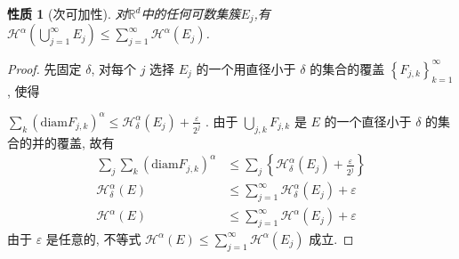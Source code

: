 \documentclass[hyperref,a4paper,UTF8]{ctexart}
\newtheorem{property}{{性质}}
\begin{document}
  \begin{property}[次可加性]
    对$\mathbb{R}^d$中的任何可数集簇${E_j}$,有$\mathcal{H}^{\alpha}\left(\bigcup\limits_{j=1}^{\infty} E_j\right) \leqslant \sum\limits_{j=1}^{\infty} \mathcal{H}^{\alpha}\left(E_j\right)$. 
  \end{property}
  \begin{proof}
    先固定 $\delta$, 对每个 $j$ 选择 $E_j$ 的一个用直径小于 $\delta$ 的集合的覆盖 
    $\left\{F_{j, k}\right\}_{k=1}^{\infty}$, 使得 
    
    $\sum\limits_k\left(\mathrm{diam} F_{j, k}\right)^\alpha \leqslant \mathcal{H}_\delta^\alpha\left(E_j\right)+\frac{\varepsilon}{2^j}$ .
    由于 $\bigcup\limits_{j, k} F_{j, k}$ 是 $E$ 的一个直径小于 $\delta$ 的集合的并的覆盖, 故有
    $$
      \begin{aligned}
        \sum_{j}\sum\limits_k\left(\mathrm{diam} F_{j, k}\right)^\alpha & \leqslant \sum_{j} \left \{\mathcal{H}_\delta^\alpha\left(E_j\right)+\frac{\varepsilon}{2^j} \right \}\\
        \mathcal{H}_\delta^\alpha(E) & \leqslant \sum_{j=1}^{\infty} \mathcal{H}_\delta^\alpha \left(E_j\right)+\varepsilon \\
        \mathcal{H}^\alpha(E) & \leqslant \sum_{j=1}^{\infty} \mathcal{H}^\alpha\left(E_j\right)+\varepsilon 
      \end{aligned}
    $$
    由于 $\varepsilon$ 是任意的, 不等式 $\mathcal{H}^\alpha(E)\leqslant \sum\limits_{j=1}^{\infty} \mathcal{H}^\alpha\left(E_j\right)$ 成立.
  \end{proof}
\end{document}
